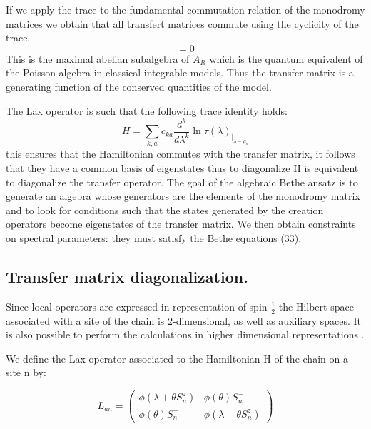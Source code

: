 \documentclass[12pt]{article}
\begin{document}
If we apply the trace to the fundamental commutation relation of the monodromy matrices we obtain that all transfert matrices commute using the cyclicity of the trace.
\begin{equation}
[\tau(\lambda),\tau(\mu)]=0
\end{equation}
This is the maximal abelian subalgebra of $A_{R}$ which is the quantum equivalent of the Poisson algebra in classical integrable models. Thus the transfer matrix is a generating function of the conserved quantities of the model. 

The Lax operator is such that the following trace identity holds:
\begin{equation}
H=\sum_{k,a} c_{ka}\frac{d^k}{d\lambda^k}\ln\tau(\lambda)_{|_{\lambda=\mu_{a}}}
\end{equation}
this ensures that the Hamiltonian commutes with the transfer matrix, it follows that they have a common basis of eigenstates thus to diagonalize H is equivalent to diagonalize the transfer operator. The goal of the algebraic Bethe ansatz is to generate an algebra whose generators are the elements of the monodromy matrix and to look for conditions such that the states generated by the creation operators become eigenstates of the transfer matrix. We then obtain constraints on spectral parameters: they must satisfy the Bethe equations (33).

\subsection{Transfer matrix diagonalization.}

Since local operators are expressed in representation of spin $ \frac{1}{2} $ the Hilbert space associated with a site of the chain is 2-dimensional, as well as auxiliary spaces. It is also possible to perform the calculations in higher dimensional representations \cite{Fad82}.

We define the Lax operator associated to the Hamiltonian H of the chain on a site n by:



\begin{equation}
L_{an}= \begin{pmatrix}
\phi(\lambda+\theta S_{n}^z) & \phi(\theta) S_{n}^{-} \\
\phi(\theta) S_{n}^{+} & \phi(\lambda-\theta S_{n}^{z}) 
\end{pmatrix}
\end{equation}
\end{document}
